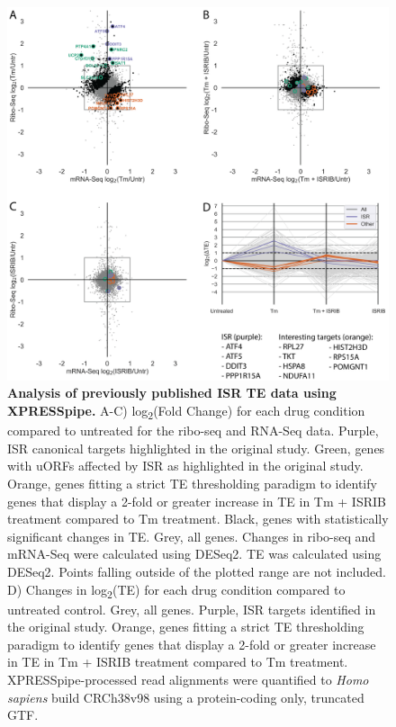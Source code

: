 \documentclass[10pt, oneside]{article}
\begin{document}
\begin{figure}
\centering
  \includegraphics[width=180mm]{figures/xpresspipe_figure3.png}
  \caption{\textbf{Analysis of previously published ISR TE data using XPRESSpipe.} A-C) log\textsubscript{2}(Fold Change) for each drug condition compared to untreated for the ribo-seq and RNA-Seq data. Purple, ISR canonical targets highlighted in the original study. Green, genes with uORFs affected by ISR as highlighted in the original study. Orange, genes fitting a strict TE thresholding paradigm to identify genes that display a 2-fold or greater increase in TE in Tm + ISRIB treatment compared to Tm treatment. Black, genes with statistically significant changes in TE. Grey, all genes. Changes in ribo-seq and mRNA-Seq were calculated using DESeq2. TE was calculated using DESeq2. Points falling outside of the plotted range are not included. D) Changes in log\textsubscript{2}(TE) for each drug condition compared to untreated control. Grey, all genes. Purple, ISR targets identified in the original study. Orange, genes fitting a strict TE thresholding paradigm to identify genes that display a 2-fold or greater increase in TE in Tm + ISRIB treatment compared to Tm treatment. XPRESSpipe-processed read alignments were quantified to \textit{Homo sapiens} build CRCh38v98 using a protein-coding only, truncated GTF.}
  \label{fig:figure3}
\end{figure}
\end{document}
